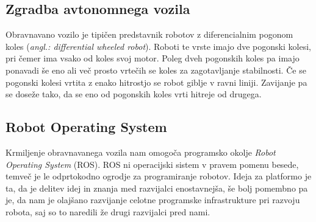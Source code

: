 \documentclass[10pt,a4paper]{article}
\begin{document}
\subsection{Zgradba avtonomnega vozila}

Obravnavano vozilo je tipičen predstavnik robotov z diferencialnim pogonom koles (\textit{angl.: differential wheeled robot}).
Roboti te vrste imajo dve pogonski kolesi, pri čemer ima vsako od koles svoj motor. Poleg dveh pogonskih koles pa imajo ponavadi še eno ali več prosto vrtečih se koles za zagotavljanje stabilnosti. Če se pogonski kolesi vrtita z enako hitrostjo se robot giblje v ravni liniji. Zavijanje pa se doseže tako, da se eno od pogonskih koles vrti hitreje od drugega. %


\subsection{Robot Operating System}

Krmiljenje obravnavanega vozila nam omogoča programsko okolje \textit{Robot Operating System} (ROS). ROS ni operacijski sistem v pravem pomenu besede, temveč je le odprtokodno ogrodje za programiranje robotov. Ideja za platformo je ta, da je delitev idej in znanja med razvijalci enostavnejša, še bolj pomembno pa je, da nam je olajšano razvijanje celotne programske infrastrukture pri razvoju robota, saj so to naredili že drugi razvijalci pred nami.
\end{document}
